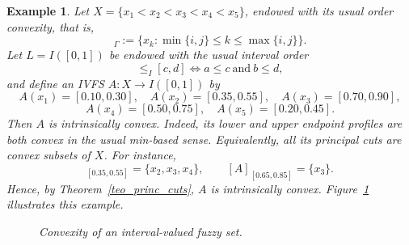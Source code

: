 \documentclass[11pt,a4paper]{article}
\newtheorem{example}{Example}
\begin{document}
\begin{example}\label{ex1}
Let \(X=\{x_1<x_2<x_3<x_4<x_5\}\), endowed with its usual order convexity, that is,
\begin{equation*}
[x_i,x_j]_{\Gamma}:=\{x_k:\min\{i,j\}\le k\le \max\{i,j\}\}.
\end{equation*}
Let \(L=I([0,1])\) be endowed with the usual interval order
\begin{equation*}
[a,b]\le_I[c,d]\iff a\le c\ \text{and}\ b\le d,
\end{equation*}
and define an IVFS \(A:X\to I([0,1])\) by
\begin{equation*}
A(x_1)=[0.10,0.30],\quad
A(x_2)=[0.35,0.55],\quad
A(x_3)=[0.70,0.90],
\end{equation*}
\begin{equation*}
A(x_4)=[0.50,0.75],\quad
A(x_5)=[0.20,0.45].
\end{equation*}
Then \(A\) is intrinsically convex. Indeed, its lower and upper endpoint profiles are both convex in the usual min-based sense. Equivalently, all its principal cuts are convex subsets of \(X\). For instance,
\begin{equation*}
[A]_{[0.35,0.55]}=\{x_2,x_3,x_4\},
\qquad
[A]_{[0.65,0.85]}=\{x_3\}.
\end{equation*}
Hence, by Theorem~\ref{teo_princ_cuts}, \(A\) is intrinsically convex. Figure~\ref{fig:level-cuts-example} illustrates this example.

\begin{figure}[htbp]
\centering
\scriptsize
{}
\caption{Convexity of an interval-valued fuzzy set.}
\label{fig:level-cuts-example}
\end{figure}
\end{example}
\end{document}
